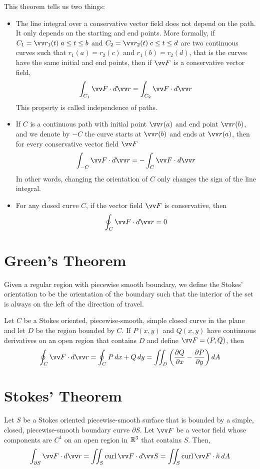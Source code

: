 This theorem tells us two things:
\begin{itemize}
    \item The line integral over a conservative vector field does not depend on the path. It only depends on the starting and end points. More formally, if $C_1= \vv r_1(t)\; a \leq t \leq b$ and $C_2 = \vv r_2(t) \; c \leq t \leq d$ are two continuous curves such that $r_1(a)=r_2(c)$ and $r_1(b)=r_2(d)$, that is the curves have the same initial and end points, then if $\vv F$ is a conservative vector field,
    $$
    \int_{C_1} \vv F \cdot d\vv r = \int_{C_2} \vv F \cdot d\vv r
    $$
    This property is called independence of paths.
    \item If $C$ is a continuous path with initial point $\vv r(a)$ and end point $\vv r(b)$, and we denote by $-C$ the curve starts at $\vv r(b)$ and ends at $\vv r(a)$, then for every conservative vector field $\vv F$
    $$
    \int_{-C} \vv F \cdot d\vv r = -\int_C \vv F \cdot d\vv r
    $$
    In other words, changing the orientation of $C$ only changes the sign of the line integral.
    \item For any closed curve $C$, if the vector field $\vv F$ is conservative, then
    $$
    \oint_C \vv F \cdot d\vv r = 0
    $$
\end{itemize}

\section{Green's Theorem}

\begin{definition}
Given a regular region with piecewise smooth boundary, we define the Stokes' orientation to be the orientation of the boundary such that the interior of the set is always on the left of the direction of travel.
\end{definition}

\begin{theorem}
Let $C$ be a Stokes oriented, piecewise-smooth, simple closed curve in the plane and let $D$ be the region bounded by $C$. If $P(x,y)$ and $Q(x,y)$ have continuous derivatives on an open region that contains $D$ and define $\vv F=(P,Q)$, then
$$
\oint_C \vv F \cdot d\vv r = \oint_C P \, dx + Q \, dy = \iint_D \left( \partialderiv{Q}{x} - \partialderiv{P}{y} \right) dA
$$
\end{theorem}

\section{Stokes' Theorem}

\begin{theorem}
Let $S$ be a Stokes oriented piecewise-smooth surface that is bounded by a simple, closed, piecewise-smooth boundary curve $\partial S$. Let $\vv F$ be a vector field whose components are $C^1$ on an open region in ${\mathbb R}^3$ that contains $S$. Then,
$$
\int_{\partial S} \vv F \cdot d\vv r = \iint_S \Curl \vv F \cdot d\vv S = \iint_S \Curl \vv F \cdot \hat{n}\, dA
$$
\end{theorem}


